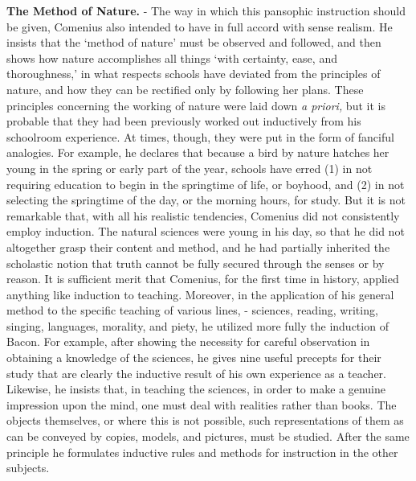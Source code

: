 \documentclass[
]{book}
\begin{document}
\textbf{The Method of Nature.} - The way in which this pansophic instruction should be given, Comenius also intended to have in full accord with sense realism. He insists that the `method of nature' must be observed and followed, and then shows how nature accomplishes all things `with certainty, ease, and thoroughness,' in what respects schools have deviated from the principles of nature, and how they can be rectified only by following her plans. These principles concerning the working of nature were laid down \emph{a priori,} but it is probable that they had been previously worked out inductively from his schoolroom experience. At times, though, they were put in the form of fanciful analogies. For example, he declares that because a bird by nature hatches her young in the spring or early part of the year, schools have erred (1) in not requiring education to begin in the springtime of life, or boyhood, and (2) in not selecting the springtime of the day, or the morning hours, for study. But it is not remarkable that, with all his realistic tendencies, Comenius did not consistently employ induction. The natural sciences were young in his day, so that he did not altogether grasp their content and method, and he had partially inherited the scholastic notion that truth cannot be fully secured through the senses or by reason. It is sufficient merit that Comenius, for the first time in history, applied anything like induction to teaching. Moreover, in the application of his general method to the specific teaching of various lines, - sciences, reading, writing, singing, languages, morality, and piety, he utilized more fully the induction of Bacon. For example, after showing the necessity for careful observation in obtaining a knowledge of the sciences, he gives nine useful precepts for their study that are clearly the inductive result of his own experience as a teacher. Likewise, he insists that, in teaching the sciences, in order to make a genuine impression upon the mind, one must deal with realities rather than books. The objects themselves, or where this is not possible, such representations of them as can be conveyed by copies, models, and pictures, must be studied. After the same principle he formulates inductive rules and methods for instruction in the other subjects.
\end{document}
